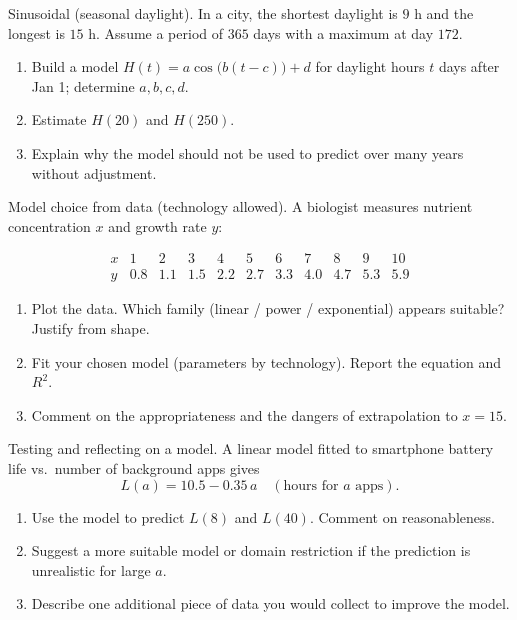 \documentclass[11pt]{article}
\def\textbf#1{#1}%
\newcounter{question}
\begin{document}
\begin{question}
\textbf{Sinusoidal (seasonal daylight).}
In a city, the shortest daylight is $9$ h and the longest is $15$ h. Assume a period of $365$ days with a maximum at day $172$.
\begin{enumerate}
  \item Build a model $H(t)=a\cos\!\big(b(t-c)\big)+d$ for daylight hours $t$ days after Jan 1; determine $a,b,c,d$.
  \item Estimate $H(20)$ and $H(250)$.
  \item Explain why the model should not be used to predict over many years without adjustment.
\end{enumerate}
\end{question}

\begin{question}
\textbf{Model choice from data (technology allowed).}
A biologist measures nutrient concentration $x$ and growth rate $y$:

\[
\begin{array}{c|cccccccccc}
x & 1&2&3&4&5&6&7&8&9&10\\\hline
y & 0.8&1.1&1.5&2.2&2.7&3.3&4.0&4.7&5.3&5.9
\end{array}
\]
\begin{enumerate}
  \item Plot the data. Which family (linear / power / exponential) appears suitable? Justify from shape.
  \item Fit your chosen model (parameters by technology). Report the equation and $R^2$.
  \item Comment on the appropriateness and the dangers of extrapolation to $x=15$.
\end{enumerate}
\end{question}

\begin{question}
\textbf{Testing and reflecting on a model.}
A linear model fitted to smartphone battery life vs.\ number of background apps gives
\[
L(a)=10.5-0.35\,a\quad(\text{hours for }a\text{ apps}).
\]
\begin{enumerate}
  \item Use the model to predict $L(8)$ and $L(40)$. Comment on reasonableness.
  \item Suggest a more suitable model or domain restriction if the prediction is unrealistic for large $a$.
  \item Describe one additional piece of data you would collect to improve the model.
\end{enumerate}
\end{question}
\end{document}
